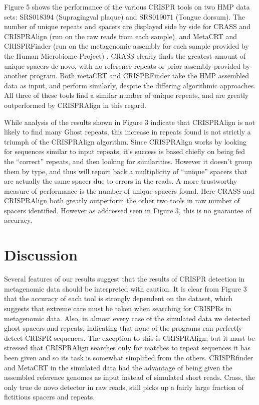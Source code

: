 \documentclass{bmcart}
\begin{document}
Figure 5 shows the performance of the various CRISPR tools on two HMP data sets: SRS018394 (Supragingval plaque) and SRS019071 (Tongue dorsum). The number of unique repeats and spacers are displayed side by side for CRASS and  CRISPRAlign (run on the raw reads from each sample), and MetaCRT and CRISPRFinder (run on the metagenomic assembly for each sample provided by the Human Microbiome Project) . CRASS clearly finds the greatest amount of unique spacers de novo, with no reference repeats or prior assembly provided by another program. Both metaCRT and CRISPRFinder take the HMP assembled data as input, and perform similarly, despite the differing algorithmic approaches. All three of these tools find a similar number of unique repeats, and are greatly outperformed by CRISPRAlign in this regard. 

While analysis of the results shown in Figure 3 indicate that CRISPRAlign is not likely to find many Ghost repeats, this increase in repeats found is not strictly a triumph of the CRISPRAlign algorithm. Since CRISPRAlign works by looking for sequences similar to input repeats, it’s success is based chiefly on being fed the “correct” repeats, and then looking for similarities. However it doesn’t group them by type, and thus will report back a multiplicity of “unique” spacers that are actually the same spacer due to errors in the reads. A more trustworthy measure of performance is the number of unique spacers found. Here CRASS and CRISPRAlign both greatly outperform the other two tools in raw number of spacers identified. However as addressed seen in Figure 3, this is no guarantee of accuracy.

\section*{Discussion}

Several features of our results suggest that the results of CRISPR detection in metagenomic data should be interpreted with caution. It is clear from Figure 3 that the accuracy of each tool is strongly dependent on the dataset, which suggests that extreme care must be taken when searching for CRISPRs in metagenomic data. Also, in almost every case of the simulated data we detected ghost spacers and repeats, indicating that none of the programs can perfectly detect CRISPR sequences. The exception to this is CRISPRAlign, but it must be stressed that CRISPRAlign searches only for matches to repeat sequences it has been given and so its task is somewhat simplified from the others. CRISPRfinder and MetaCRT in the simulated data had the advantage of being given the assembled reference genomes as input instead of simulated short reads. Crass, the only true de novo detector in raw reads, still picks up a fairly large fraction of fictitious spacers and repeats.  
\end{document}
